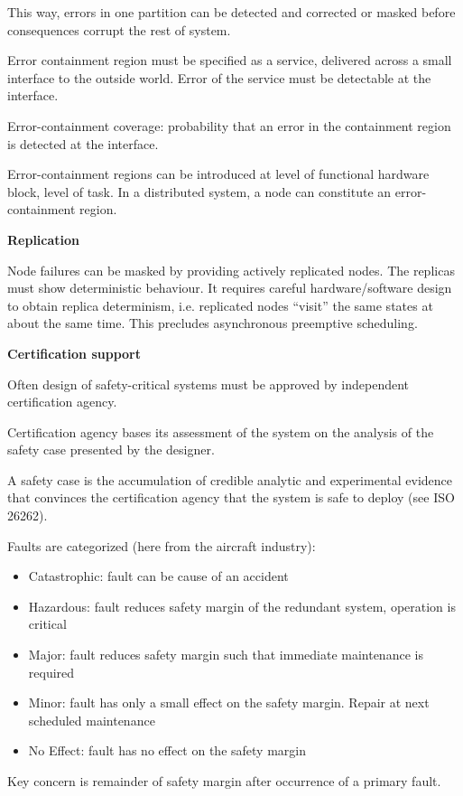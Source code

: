 This way, errors in one partition can be detected and corrected or
masked before consequences corrupt the rest of system.

Error containment region must be specified as a service, delivered
across a small interface to the outside world. Error of the service must
be detectable at the interface.

Error-containment coverage: probability that an error in the containment
region is detected at the interface.

Error-containment regions can be introduced at level of functional
hardware block, level of task. In a distributed system, a node can
constitute an error-containment region.

\textbf{Replication}

Node failures can be masked by providing actively replicated nodes. The
replicas must show deterministic behaviour. It requires careful
hardware/software design to obtain replica determinism, i.e. replicated
nodes ``visit'' the same states at about the same time. This precludes
asynchronous preemptive scheduling.

\textbf{Certification support}

Often design of safety-critical systems must be approved by independent
certification agency.

Certification agency bases its assessment of the system on the analysis
of the safety case presented by the designer.

A safety case is the accumulation of credible analytic and experimental
evidence that convinces the certification agency that the system is safe
to deploy (see ISO 26262).

Faults are categorized (here from the aircraft industry):

\begin{itemize}
\item
  Catastrophic: fault can be cause of an accident
\item
  Hazardous: fault reduces safety margin of the redundant system,
  operation is critical
\item
  Major: fault reduces safety margin such that immediate maintenance is
  required
\item
  Minor: fault has only a small effect on the safety margin. Repair at
  next scheduled maintenance
\item
  No Effect: fault has no effect on the safety margin
\end{itemize}

Key concern is remainder of safety margin after occurrence of a primary
fault.

